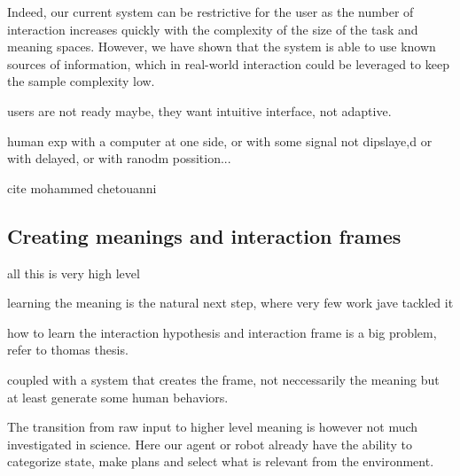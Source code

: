 Indeed, our current system can be restrictive for the user as the number of interaction increases quickly with the complexity of the size of the task and meaning spaces. However, we have shown that the system is able to use known sources of information, which in real-world interaction could be leveraged to keep the sample complexity low.

users are not ready maybe, they want intuitive interface, not adaptive.

human exp with a computer at one side, or with some signal not dipslaye,d or with delayed, or with ranodm possition...

cite mohammed chetouanni

\subsection{Creating meanings and interaction frames}


all this is very high level

learning the meaning is the natural next step, where very few work jave tackled it

how to learn the interaction hypothesis and interaction frame is a big problem, refer to thomas thesis.

coupled with a system that creates the frame, not neccessarily the meaning but at least generate some human behaviors.


The transition from raw input to higher level meaning is however not much investigated in science. Here our agent or robot already have the ability to categorize state, make plans and select what is relevant from the environment.

